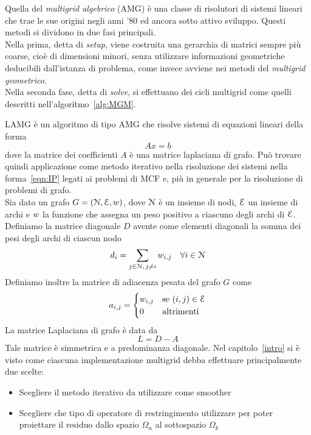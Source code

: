 \label{cap:LAMG}

Quella del \emph{multigrid algebrico} (AMG) è una classe di risolutori di sistemi lineari che trae le sue origini negli anni '80 ed ancora sotto attivo sviluppo.
Questi metodi si dividono in due fasi principali.\\
Nella prima, detta di \emph{setup}, viene costruita una gerarchia di matrici sempre più coarse, cioè di dimensioni minori, senza utilizzare informazioni geometriche deducibili dall'istanza di problema, come invece avviene nei metodi del \emph{multigrid geometrico}.\\
Nella seconda fase, detta di \emph{solve}, si effettuano dei cicli multigrid come quelli descritti nell'algoritmo~\vref{alg:MGM}.

LAMG è un algoritmo di tipo AMG che risolve sistemi di equazioni lineari della forma
\begin{equation*}
Ax = b
\end{equation*}
dove la matrice dei coefficienti $A$ è una matrice laplaciana di grafo.
Può trovare quindi applicazione come metodo iterativo nella risoluzione dei sistemi nella forma~\eqref{eqn:IP} legati ai problemi di MCF e, più in generale per la risoluzione di problemi di grafo.\\
Sia dato un grafo $G=(\mathcal{N},\mathcal{E},w)$, dove $\mathcal{N}$ è un insieme di nodi, $\mathcal{E}$ un insieme di archi e $w$ la funzione che assegna un peso positivo a ciascuno degli archi di $\mathcal{E}$. \\
Definiamo la matrice diagonale $D$ avente come elementi diagonali la somma dei pesi degli archi di ciascun nodo
\begin{equation}
d_i = \sum_{j \in \mathcal{N},\,j \ne i} w_{i,j} \quad \forall i \in \mathcal{N}
\end{equation}
Definiamo inoltre la matrice di adiacenza pesata del grafo $G$ come
\begin{equation}
a_{i,j} = 
\begin{cases}
w_{i,j} & \text{se } (i,j) \in \mathcal{E}\\
0 							& \text{altrimenti}
\end{cases}
\end{equation}
La matrice Laplaciana di grafo è data da
\begin{equation}
L = D - A
\end{equation}
Tale matrice è simmetrica e a predominanza diagonale.
Nel capitolo~\vref{intro} si è visto come ciascuna implementazione multigrid debba effettuare principalmente due scelte:
\begin{itemize}
\item Scegliere il metodo iterativo da utilizzare come smoother
\item Scegliere che tipo di operatore di restringimento utilizzare per poter proiettare il residuo dallo spazio $\Omega_n$ al sottospazio $\Omega_k$
\end{itemize}


